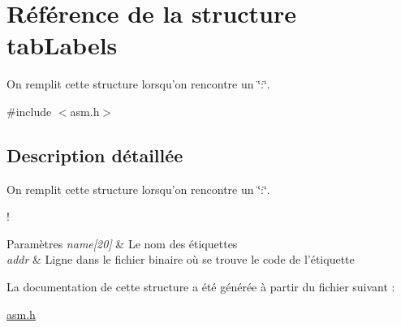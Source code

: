 \hypertarget{structtabLabels}{\section{Référence de la structure tab\-Labels}
\label{structtabLabels}
}


On remplit cette structure lorsqu'on rencontre un \char`\"{}\-:\char`\"{}.  




{\ttfamily \#include $<$asm.\-h$>$}



\subsection{Description détaillée}
On remplit cette structure lorsqu'on rencontre un \char`\"{}\-:\char`\"{}. 

! 
\begin{DoxyParams}{Paramètres}
{\em name\mbox{[}20\mbox{]}} & Le nom des étiquettes \\
\hline
{\em addr} & Ligne dans le fichier binaire où se trouve le code de l'étiquette \\
\hline
\end{DoxyParams}


La documentation de cette structure a été générée à partir du fichier suivant \-:\begin{DoxyCompactItemize}
\item 
\hyperlink{asm_8h}{asm.\-h}\end{DoxyCompactItemize}
